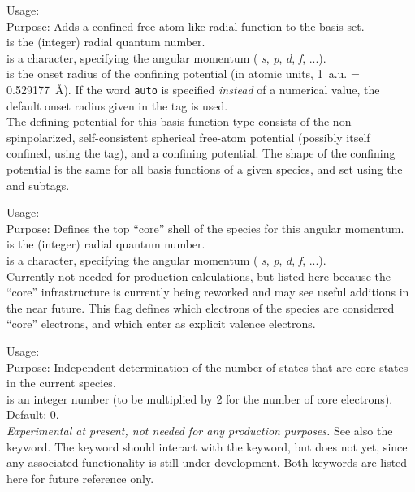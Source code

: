 {
  \noindent
  Usage:   
     \\[1.0ex]
  Purpose: Adds a confined free-atom like radial function to the basis
    set. \\[1.0ex]
   is the (integer) radial quantum number. \\
   is a character, specifying the angular momentum (
    \emph{s}, \emph{p}, \emph{d}, \emph{f}, ...). \\
   is the onset radius of the confining potential
    (in atomic units, 1~a.u. = 0.529177~\AA). If the word
    \texttt{auto} is specified \emph{instead} of a numerical value,
    the default onset radius given in the
     tag is used. \\
}
The defining potential for this basis function type consists of the
non-spinpolarized, self-consistent spherical free-atom potential
(possibly itself confined, using the
 tag), and a confining
potential. The shape of the confining potential is the same for all
basis functions of a given species, and set using the
 and  
subtags. 

{
  \noindent
  Usage:    \\[1.0ex]
  Purpose: Defines the top ``core'' shell of the species for this
    angular momentum. \\[1.0ex]  
   is the (integer) radial quantum number. \\
   is a character, specifying the angular momentum (
    \emph{s}, \emph{p}, \emph{d}, \emph{f}, ...). \\
}
Currently not needed for production calculations, but listed here
because the ``core'' infrastructure is currently being reworked and
may see useful additions in the near future. This flag defines 
which electrons of the species are considered ``core'' electrons, and
which enter as explicit valence electrons.

{
  \noindent
  Usage:   \\[1.0ex]
  Purpose: Independent determination of the number of states that are
    core states in the current species. \\[1.0ex]
   is an integer number (to be multiplied by 2 for the
    number of core electrons). Default: 0. \\
}
\emph{Experimental at present, not needed for any production
  purposes.} See also the  keyword. The
 keyword should interact with the
 keyword, but does not yet, since any
associated functionality is still under development. Both keywords are
listed here for future reference only.


